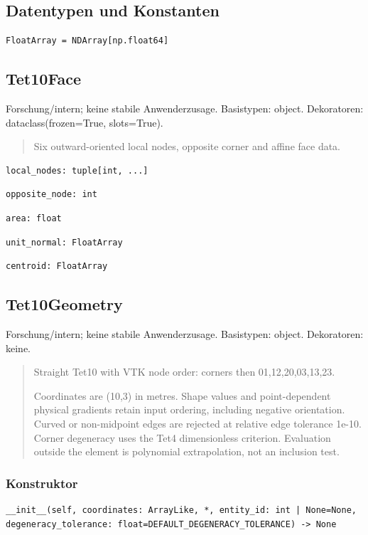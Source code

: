 \subsection*{Datentypen und Konstanten}
\begin{lstlisting}
FloatArray = NDArray[np.float64]
\end{lstlisting}
\subsection{Tet10Face}
Forschung/intern; keine stabile Anwenderzusage.
Basistypen: object. Dekoratoren: dataclass(frozen=True, slots=True).
\begin{quote}
Six outward-oriented local nodes, opposite corner and affine face data.
\end{quote}
\begin{lstlisting}
local_nodes: tuple[int, ...]
\end{lstlisting}
\begin{lstlisting}
opposite_node: int
\end{lstlisting}
\begin{lstlisting}
area: float
\end{lstlisting}
\begin{lstlisting}
unit_normal: FloatArray
\end{lstlisting}
\begin{lstlisting}
centroid: FloatArray
\end{lstlisting}
\subsection{Tet10Geometry}
Forschung/intern; keine stabile Anwenderzusage.
Basistypen: object. Dekoratoren: keine.
\begin{quote}
Straight Tet10 with VTK node order: corners then 01,12,20,03,13,23.\par Coordinates are (10,3) in metres. Shape values and point-dependent physical gradients retain input ordering, including negative orientation. Curved or non-midpoint edges are rejected at relative edge tolerance 1e-10. Corner degeneracy uses the Tet4 dimensionless criterion. Evaluation outside the element is polynomial extrapolation, not an inclusion test.
\end{quote}
\subsubsection*{Konstruktor}
\begin{lstlisting}
__init__(self, coordinates: ArrayLike, *, entity_id: int | None=None, degeneracy_tolerance: float=DEFAULT_DEGENERACY_TOLERANCE) -> None
\end{lstlisting}
